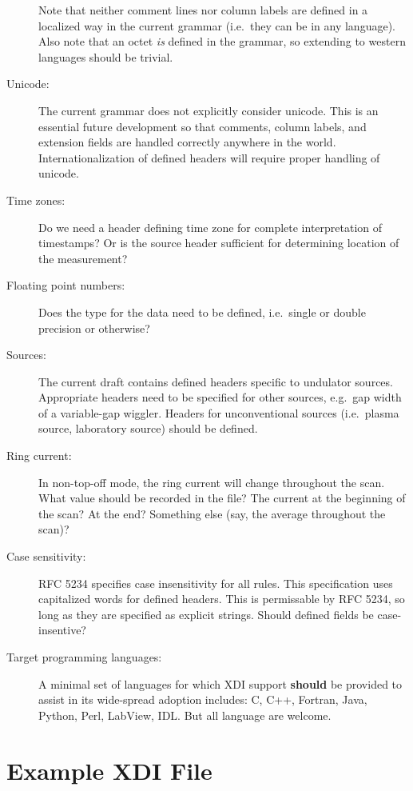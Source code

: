 \documentclass{article}
\newcommand{\xdi}{\textsf{XDI}}
\begin{document}
\begin{description}
  Note that neither comment lines nor column labels are defined in a
  localized way in the current grammar (i.e.\ they can be in any
  language).  Also note that an octet \textit{is} defined in the
  grammar, so extending to western languages should be trivial.
\item[Unicode:] The current grammar does not explicitly consider
  unicode.  This is an essential future development so that comments,
  column labels, and extension fields are handled correctly anywhere
  in the world.  Internationalization of defined headers will require
  proper handling of unicode.\label{anchor:unicode}
\item[Time zones:] Do we need a header defining time zone for complete
  interpretation of timestamps? Or is the source header sufficient for
  determining location of the measurement?\label{anchor:timezones}
\item[Floating point numbers:] Does the type for the data need to be
  defined, i.e.\ single or double precision or
  otherwise?\label{anchor:floats}
\item[Sources:] The current draft contains defined headers specific to
  undulator sources.  Appropriate headers need to be specified for
  other sources, e.g.\ gap width of a variable-gap wiggler.  Headers
  for unconventional sources (i.e.\ plasma source, laboratory source)
  should be defined.\label{anchor:sources}
\item[Ring current:] In non-top-off mode, the ring current will change
  throughout the scan.  What value should be recorded in the file?
  The current at the beginning of the scan?  At the end?  Something
  else (say, the average throughout the scan)?\label{anchor:current}
\item[Case sensitivity:] RFC 5234 specifies case insensitivity for all
  rules.  This specification uses capitalized words for defined
  headers.  This is permissable by RFC 5234, so long as they are
  specified as explicit strings.  Should defined fields be
  case-insentive?
\item[Target programming languages:] A minimal set of languages for
  which {\xdi} support \textbf{should} be provided to assist in its
  wide-spread adoption includes: C, C++, Fortran, Java, Python, Perl,
  LabView, IDL.  But all language are welcome.
\end{description}

\newpage
\appendix

\section{Example XDI File}
\label{apdx:example}
\end{document}
